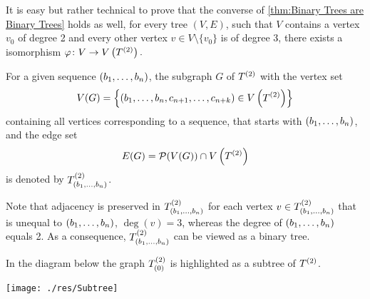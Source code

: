 \begin{rem}
It is easy but rather technical to prove that the converse of \cref{thm:Binary Trees are Binary Trees} holds as well, \ie{} for every tree $(V,E)$, such that $V$ contains a vertex $v_0$ of degree 2 and every other vertex $v\in V\setminus\lbrace v_0\rbrace$ is of degree 3, there exists a isomorphism $\varphi\colon V\to\VT.$ 
\end{rem}

\begin{defin}
For a given sequence $(\seq{b})$, the subgraph $G$ of $\T$ with the vertex set 
\begin{equation*}
V(G)=\left\lbrace (\seq[n]{b},c_{n+1},\ldots,c_{n+k})\in\VT \right\rbrace
\end{equation*}
containing all vertices corresponding to a sequence, that starts with $(\seq{b})$, and the edge set
\begin{equation*}
E(G)=\mathcal{P}(V(G))\cap \VT
\end{equation*}
is denoted by $\ST{(\seq{b})}$.
\end{defin}

Note that adjacency is preserved in $\ST{(\seq{b})}$ for each vertex $v\in\ST{(\seq{b})}$ that is unequal to $(\seq{b})$, \ie{} $\deg(v)=3$, whereas the degree of $(\seq{b})$ equals 2. As a consequence, $\ST{(\seq{b})}$ can be viewed as a binary tree.

In the diagram below the graph $\ST{(0)}$ is highlighted as a subtree of $\T$.

\begin{center}
\texttt{[image: ./res/Subtree]}
%
%
\end{center}

